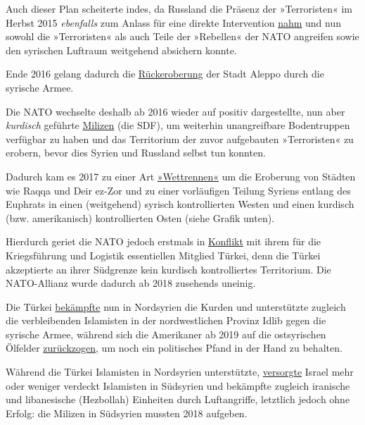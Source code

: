 Auch dieser Plan scheiterte indes, da Russland die Präsenz der
»Terroristen« im Herbst 2015 \emph{ebenfalls} zum Anlass für eine
direkte Intervention
\href{https://en.wikipedia.org/wiki/Russian_military_intervention_in_the_Syrian_Civil_War}{nahm}
und nun sowohl die »Terroristen« als auch Teile der »Rebellen« der NATO
angreifen sowie den syrischen Luftraum weitgehend absichern konnte.

Ende 2016 gelang dadurch die
\href{https://en.wikipedia.org/wiki/Battle_of_Aleppo_(2012\%E2\%80\%932016)}{Rückeroberung}
der Stadt Aleppo durch die syrische Armee.

Die NATO wechselte deshalb ab 2016 wieder auf positiv dargestellte, nun
aber \emph{kurdisch} geführte
\href{https://en.wikipedia.org/wiki/Syrian_Democratic_Forces}{Milizen}
(die SDF), um weiterhin unangreifbare Bodentruppen verfügbar zu haben
und das Territorium der zuvor aufgebauten »Terroristen« zu erobern,
bevor dies Syrien und Russland selbst tun konnten.

Dadurch kam es 2017 zu einer Art
\href{https://www.economist.com/middle-east-and-africa/2017/03/23/the-noose-is-tightening-in-syria}{»Wettrennen«}
um die Eroberung von Städten wie Raqqa und Deir ez-Zor und zu einer
vorläufigen Teilung Syriens entlang des Euphrats in einen (weitgehend)
syrisch kontrollierten Westen und einen kurdisch (bzw. amerikanisch)
kontrollierten Osten (siehe Grafik unten).

Hierdurch geriet die NATO jedoch erstmals in
\href{https://www.dw.com/en/nato-allies-clash-as-turkey-attacks-us-backed-kurds-in-syria/a-42262543}{Konflikt}
mit ihrem für die Kriegsführung und Logistik essentiellen Mitglied
Türkei, denn die Türkei akzeptierte an ihrer Südgrenze kein kurdisch
kontrolliertes Territorium. Die NATO-Allianz wurde dadurch ab 2018
zusehends uneinig.

Die Türkei
\href{https://en.wikipedia.org/wiki/Turkish_occupation_of_northern_Syria}{bekämpfte}
nun in Nordsyrien die Kurden und unterstützte zugleich die verbleibenden
Islamisten in der nordwestlichen Provinz Idlib gegen die syrische Armee,
während sich die Amerikaner ab 2019 auf die ostsyrischen Ölfelder
\href{https://www.france24.com/en/20191026-after-abandoning-kurds-us-to-send-troops-to-syria-oil-fields}{zurückzogen},
um noch ein politisches Pfand in der Hand zu behalten.

Während die Türkei Islamisten in Nordsyrien unterstützte,
\href{https://www.jpost.com/Middle-East/Report-Israel-treating-al-Qaida-fighters-wounded-in-Syria-civil-war-393862}{versorgte}
Israel mehr oder weniger verdeckt Islamisten in Südsyrien und bekämpfte
zugleich iranische und libanesische (Hezbollah) Einheiten durch
Luftangriffe, letztlich jedoch ohne Erfolg: die Milizen in Südsyrien
mussten 2018 aufgeben.

